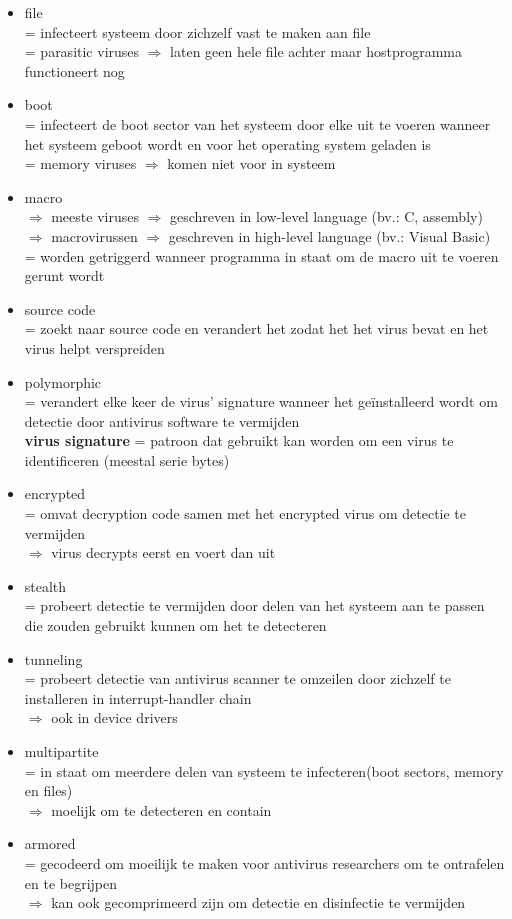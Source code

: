 \documentclass{report}
\begin{document}
\begin{itemize}
\item file
\\= infecteert systeem door zichzelf vast te maken aan file
\\= parasitic viruses $\Rightarrow$ laten geen hele file achter maar hostprogramma functioneert nog
\item boot 
\\= infecteert de boot sector van het systeem door elke uit te voeren wanneer het systeem geboot wordt en voor het operating system geladen is
\\= memory viruses $\Rightarrow$ komen niet voor in systeem
\item macro 
\\ $\Rightarrow$ meeste viruses $\Rightarrow$ geschreven in low-level language (bv.: C, assembly)
\\ $\Rightarrow$ macrovirussen $\Rightarrow$ geschreven in high-level language (bv.: Visual Basic)
\\ = worden getriggerd wanneer programma in staat om de macro uit te voeren gerunt wordt
\item source code
\\= zoekt naar source code en verandert het zodat het het virus bevat en het virus helpt verspreiden
\item polymorphic
\\= verandert elke keer de virus' signature wanneer het ge\"installeerd wordt om detectie door antivirus software te vermijden
\\ \textbf{virus signature} = patroon dat gebruikt kan worden om een virus te identificeren (meestal serie bytes)
\item encrypted
\\= omvat decryption code samen met het encrypted virus om detectie te vermijden
\\$\Rightarrow$ virus decrypts eerst en voert dan uit
\item stealth
\\ = probeert detectie te vermijden door delen van het systeem aan te passen die zouden gebruikt kunnen om het te detecteren
\item tunneling
\\ = probeert detectie van antivirus scanner te omzeilen door zichzelf te installeren in interrupt-handler chain
\\ $\Rightarrow$ ook in device drivers
\item multipartite
\\= in staat om meerdere delen van systeem te infecteren(boot sectors, memory en files)
\\$\Rightarrow$ moelijk om te detecteren en contain
\item armored
\\= gecodeerd om moeilijk te maken voor antivirus researchers om te ontrafelen en te begrijpen
\\$\Rightarrow$ kan ook gecomprimeerd zijn om detectie en disinfectie te vermijden
\end{itemize}
\end{document}
